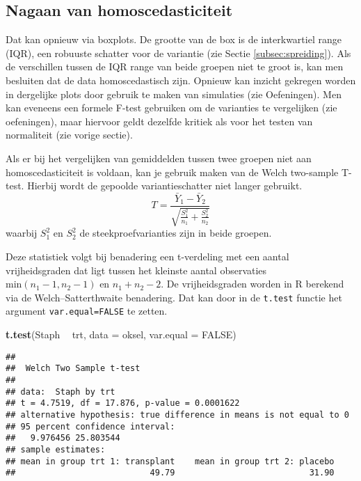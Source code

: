 \documentclass[12pt,dutch,coursenotes]{book}
\newenvironment{Shaded}{\begin{snugshade}}{\end{snugshade}}
\newcommand{\KeywordTok}[1]{\textcolor[rgb]{0.13,0.29,0.53}{\textbf{#1}}}
\newcommand{\DataTypeTok}[1]{\textcolor[rgb]{0.13,0.29,0.53}{#1}}
\newcommand{\StringTok}[1]{\textcolor[rgb]{0.31,0.60,0.02}{#1}}
\newcommand{\OtherTok}[1]{\textcolor[rgb]{0.56,0.35,0.01}{#1}}
\newcommand{\OperatorTok}[1]{\textcolor[rgb]{0.81,0.36,0.00}{\textbf{#1}}}
\newcommand{\NormalTok}[1]{#1}
\theoremstyle{definition}
\theoremstyle{definition}
\theoremstyle{definition}
\theoremstyle{remark}
\begin{document}
\subsection{Nagaan van
homoscedasticiteit}\label{nagaan-van-homoscedasticiteit}

Dat kan opnieuw via boxplots. De grootte van de box is de interkwartiel
range (IQR), een robuuste schatter voor de variantie (zie Sectie
\ref{subsec:spreiding}). Als de verschillen tussen de IQR range van
beide groepen niet te groot is, kan men besluiten dat de data
homoscedastisch zijn. Opnieuw kan inzicht gekregen worden in dergelijke
plots door gebruik te maken van simulaties (zie Oefeningen). Men kan
eveneens een formele F-test gebruiken om de varianties te vergelijken
(zie oefeningen), maar hiervoor geldt dezelfde kritiek als voor het
testen van normaliteit (zie vorige sectie).

Als er bij het vergelijken van gemiddelden tussen twee groepen niet aan
homoscedasticiteit is voldaan, kan je gebruik maken van de Welch
two-sample T-test. Hierbij wordt de gepoolde variantieschatter niet
langer gebruikt.
\[T =  \frac{\bar{Y}_1 - \bar{Y}_2}{\sqrt{\frac{S^2_1}{n_1}+\frac{S^2_2}{n_2}}}\]
waarbij \(S^2_1\) en \(S^2_2\) de steekproefvarianties zijn in beide
groepen.

Deze statistiek volgt bij benadering een t-verdeling met een aantal
vrijheidsgraden dat ligt tussen het kleinste aantal observaties
\(\text{min}(n_1-1,n_2-1)\) en \(n_1+n_2-2\). De vrijheidsgraden worden
in R berekend via de Welch--Satterthwaite benadering. Dat kan door in de
\texttt{t.test} functie het argument \texttt{var.equal=FALSE} te zetten.

\begin{Shaded}
\begin{Highlighting}[]
\KeywordTok{t.test}\NormalTok{(Staph }\OperatorTok{~}\StringTok{ }\NormalTok{trt, }\DataTypeTok{data =}\NormalTok{ oksel, }\DataTypeTok{var.equal =} \OtherTok{FALSE}\NormalTok{)}
\end{Highlighting}
\end{Shaded}

\begin{verbatim}
## 
##  Welch Two Sample t-test
## 
## data:  Staph by trt
## t = 4.7519, df = 17.876, p-value = 0.0001622
## alternative hypothesis: true difference in means is not equal to 0
## 95 percent confidence interval:
##   9.976456 25.803544
## sample estimates:
## mean in group trt 1: transplant    mean in group trt 2: placebo 
##                           49.79                           31.90
\end{verbatim}
\end{document}
